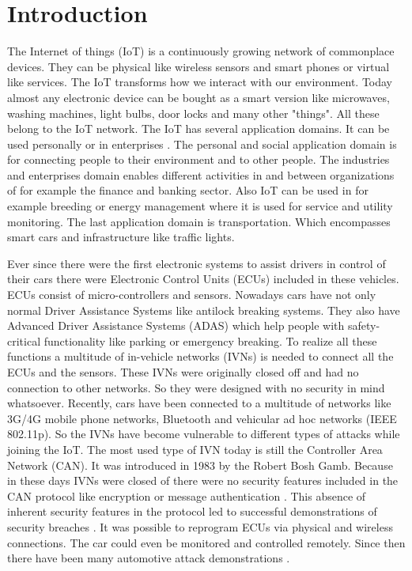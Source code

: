 
\section{Introduction}

The Internet of things (IoT) is a continuously growing network of commonplace
devices. They can be physical like wireless sensors and smart phones or virtual
like services. The IoT transforms how we interact with our environment. Today
almost any electronic device can be bought as a smart version like microwaves,
washing machines, light bulbs, door locks and many other "things". All these
belong to the IoT network. The IoT has several application domains. It can be
used personally or in enterprises \cite{Mahmoud2015}. The personal and social
application domain is for connecting people to their environment and to other
people. The industries and enterprises domain enables different activities in
and between organizations of for example the finance and banking sector. Also
IoT can be used in for example breeding or energy management where it is used
for service and utility monitoring. The last application domain is
transportation. Which encompasses smart cars and infrastructure like traffic
lights.

Ever since there were the first electronic systems to assist drivers in control
of their cars there were Electronic Control Units (ECUs) included in these
vehicles. ECUs consist of micro-controllers and sensors. Nowadays cars have not
only normal Driver Assistance Systems like antilock breaking systems. They also
have Advanced Driver Assistance Systems (ADAS) which help people with
safety-critical functionality like parking or emergency breaking. To realize all
these functions a multitude of in-vehicle networks (IVNs) is needed to connect
all the ECUs and the sensors. These IVNs were originally closed off and had no
connection to other networks. So they were designed with no security in mind
whatsoever. Recently, cars have been connected to a multitude of networks like
3G/4G mobile phone networks, Bluetooth and vehicular ad hoc networks (IEEE
802.11p). So the IVNs have become vulnerable to different types of attacks while
joining the IoT. The most used type of IVN today is still the Controller Area
Network (CAN). It was introduced in 1983 by the Robert Bosh Gamb. Because in
these days IVNs were closed of there were no security features included in the
CAN protocol like encryption or message authentication \cite{Avatefipour2017}.
This absence of inherent security features in the protocol led to successful
demonstrations of security breaches \cite{Koscher2010}. It was possible to
reprogram ECUs via physical and wireless connections. The car could even be
monitored and controlled remotely. Since then there have been many automotive
attack demonstrations \cite{Hoppe2011,Checkoway2011,Cheah2017}.

